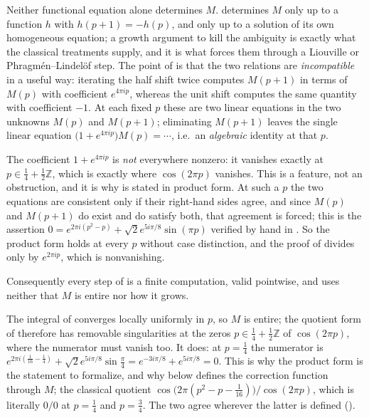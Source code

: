 \begin{remark}
\label{rem:rsf_why_algebraic}
Neither functional equation alone determines $M$.   determines $M$ only
up to a function $h$ with $h(p+1)=-h(p)$, and  only up to a solution of
its own homogeneous equation; a growth argument to kill the ambiguity is exactly what the
classical treatments supply, and it is what forces them through a Liouville or
Phragm\'en--Lindel\"of step.  The point of  is that the two relations
are \emph{incompatible} in a useful way: iterating the half shift twice computes $M(p+1)$ in
terms of $M(p)$ with coefficient $e^{4\pi ip}$, whereas the unit shift computes the same
quantity with coefficient $-1$.  At each fixed $p$ these are two linear equations in the two
unknowns $M(p)$ and $M(p+1)$; eliminating $M(p+1)$ leaves the single linear equation
$\bigl(1+e^{4\pi ip}\bigr)M(p)=\cdots$, i.e.\ an \emph{algebraic} identity at that $p$.

The coefficient $1+e^{4\pi ip}$ is \emph{not} everywhere nonzero: it vanishes exactly at
$p\in\tfrac14+\tfrac12\mathbb{Z}$, which is exactly where $\cos(2\pi p)$ vanishes.  This is a
feature, not an obstruction, and it is why  is stated in product
form.  At such a $p$ the two equations are consistent only if their right-hand sides agree, and
since $M(p)$ and $M(p+1)$ do exist and do satisfy both, that agreement is forced; this is
the assertion $0=e^{2\pi i(p^{2}-p)}+\sqrt2e^{5i\pi/8}\sin(\pi p)$ verified by hand in
.  So the product form holds at every $p$ without case distinction, and
the proof of  divides only by $e^{2\pi ip}$, which is nonvanishing.

Consequently every step of  is a finite computation, valid pointwise, and
uses neither that $M$ is entire nor how it grows.
\end{remark}

\begin{remark}
\label{rem:rsf_removable}
The integral of  converges locally uniformly in $p$, so $M$ is entire;
the quotient form of  therefore has removable singularities at the
zeros $p\in\tfrac14+\tfrac12\mathbb{Z}$ of $\cos(2\pi p)$, where the numerator must vanish too.
It does: at $p=\tfrac14$ the numerator is
$e^{2\pi i\left(\frac1{16}-\frac14\right)}+\sqrt2e^{5i\pi/8}\sin\tfrac\pi4
 =e^{-3i\pi/8}+e^{5i\pi/8}=0$.
This is why the product form is the statement to formalize, and why
 below defines the correction function through $M$; the classical
quotient $\cos\bigl(2\pi(p^{2}-p-\tfrac1{16})\bigr)/\cos(2\pi p)$, which is
literally $0/0$ at $p=\tfrac14$ and $p=\tfrac34$.  The two agree wherever the latter is defined
().
\end{remark}


